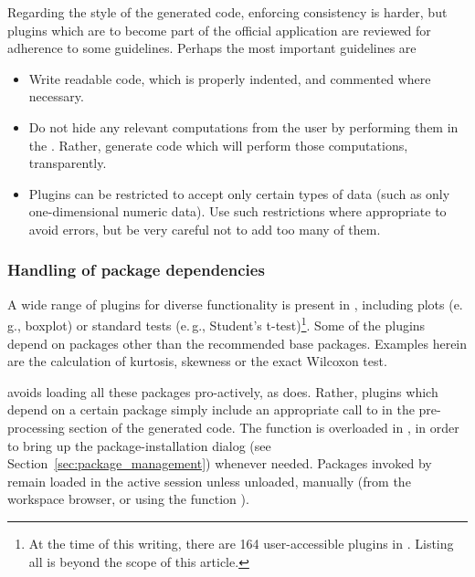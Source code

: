 Regarding the style of the generated  code, enforcing consistency is harder,
but plugins which are to become part of the official  application are
reviewed for adherence to some guidelines. Perhaps the most important guidelines
are 

\begin{itemize}
  \item 
  Write readable code, which is properly indented, and commented where necessary.

  \item 
  Do not hide any relevant computations from the user by performing them in the
  . Rather, generate  code which will perform
  those computations, transparently.

  \item
  Plugins can be restricted to accept only certain types of data (such as only one-dimensional numeric data).
  Use such restrictions where appropriate to avoid errors, but be very careful not to add
  too many of them.
\end{itemize}

\subsubsection[Handling of R package dependencies]{Handling of  package dependencies}
\label{sec:technical_plugins_dependencies}
A wide range of plugins for diverse functionality is present in ,
including plots (e.\,g., boxplot) or standard tests (e.\,g., Student's t-test)\footnote{
  At the time of this writing, there are 164 user-accessible plugins in .
  Listing all is beyond the scope of this article.
}. Some
of the plugins depend on  packages other than the recommended  base packages.
Examples herein are the calculation of kurtosis, skewness or the exact Wilcoxon
test.

 avoids loading all these packages pro-actively, as  does. Rather,
plugins which depend on a certain package simply include an appropriate call to
 in the pre-processing section of the generated  code. The 
function is overloaded in , in order to bring up the package-installation
dialog (see Section~\ref{sec:package_management}) whenever needed. Packages invoked by  remain loaded
in the active  session unless unloaded, manually (from the workspace browser, or using the
 function ).

